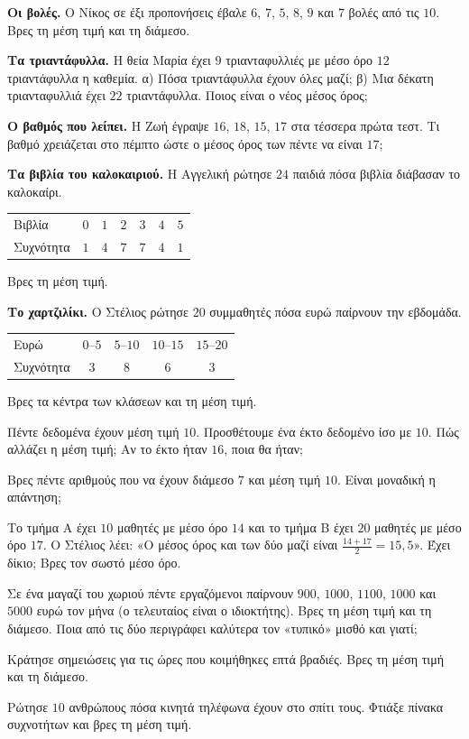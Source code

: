 \ex \textbf{Οι βολές.} Ο Νίκος σε έξι προπονήσεις έβαλε $6$, $7$, $5$, $8$, $9$ και $7$ βολές από τις $10$. Βρες τη μέση τιμή και τη διάμεσο.

\ex \textbf{Τα τριαντάφυλλα.} Η θεία Μαρία έχει $9$ τριανταφυλλιές με μέσο όρο $12$ τριαντάφυλλα η καθεμία. α) Πόσα τριαντάφυλλα έχουν όλες μαζί; β) Μια δέκατη τριανταφυλλιά έχει $22$ τριαντάφυλλα. Ποιος είναι ο νέος μέσος όρος;

\ex \textbf{Ο βαθμός που λείπει.} Η Ζωή έγραψε $16$, $18$, $15$, $17$ στα τέσσερα πρώτα τεστ. Τι βαθμό χρειάζεται στο πέμπτο ώστε ο μέσος όρος των πέντε να είναι $17$;

\ex \textbf{Τα βιβλία του καλοκαιριού.} Η Αγγελική ρώτησε $24$ παιδιά πόσα βιβλία διάβασαν το καλοκαίρι.\par
\begin{center}
\renewcommand{\arraystretch}{1.25}
\begin{tabular}{lcccccc}
\toprule
Βιβλία & $0$ & $1$ & $2$ & $3$ & $4$ & $5$\\
Συχνότητα & $1$ & $4$ & $7$ & $7$ & $4$ & $1$\\
\bottomrule
\end{tabular}
\end{center}
Βρες τη μέση τιμή.

\ex \textbf{Το χαρτζιλίκι.} Ο Στέλιος ρώτησε $20$ συμμαθητές πόσα ευρώ παίρνουν την εβδομάδα.\par
\begin{center}
\renewcommand{\arraystretch}{1.25}
\begin{tabular}{lcccc}
\toprule
Ευρώ & $0$--$5$ & $5$--$10$ & $10$--$15$ & $15$--$20$\\
Συχνότητα & $3$ & $8$ & $6$ & $3$\\
\bottomrule
\end{tabular}
\end{center}
Βρες τα κέντρα των κλάσεων και τη μέση τιμή.


\ex Πέντε δεδομένα έχουν μέση τιμή $10$. Προσθέτουμε ένα έκτο δεδομένο ίσο με $10$. Πώς αλλάζει η μέση τιμή; Αν το έκτο ήταν $16$, ποια θα ήταν;

\ex Βρες πέντε αριθμούς που να έχουν διάμεσο $7$ και μέση τιμή $10$. Είναι μοναδική η απάντηση;

\ex Το τμήμα Α έχει $10$ μαθητές με μέσο όρο $14$ και το τμήμα Β έχει $20$ μαθητές με μέσο όρο $17$. Ο Στέλιος λέει: «Ο μέσος όρος και των δύο μαζί είναι $\frac{14+17}{2}=15{,}5$». Έχει δίκιο; Βρες τον σωστό μέσο όρο.

\ex Σε ένα μαγαζί του χωριού πέντε εργαζόμενοι παίρνουν $900$, $1000$, $1100$, $1000$ και $5000$ ευρώ τον μήνα (ο τελευταίος είναι ο ιδιοκτήτης). Βρες τη μέση τιμή και τη διάμεσο. Ποια από τις δύο περιγράφει καλύτερα τον «τυπικό» μισθό και γιατί;


\ex Κράτησε σημειώσεις για τις ώρες που κοιμήθηκες επτά βραδιές. Βρες τη μέση τιμή και τη διάμεσο.

\ex Ρώτησε $10$ ανθρώπους πόσα κινητά τηλέφωνα έχουν στο σπίτι τους. Φτιάξε πίνακα συχνοτήτων και βρες τη μέση τιμή.
